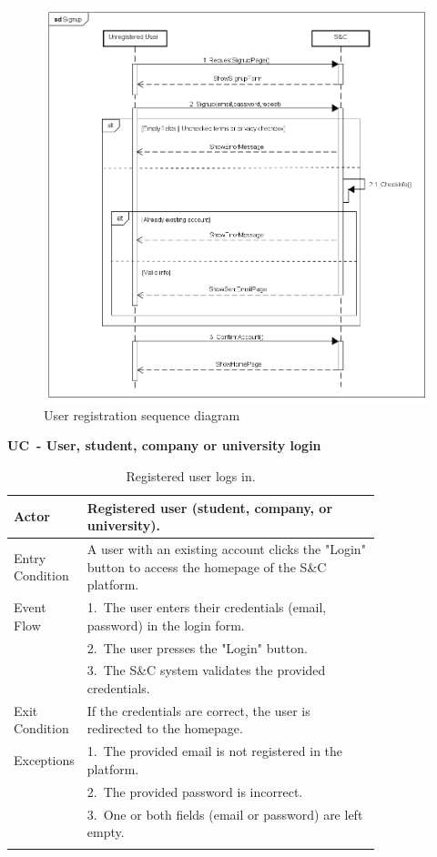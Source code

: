 \begin{figure}[H]
    \centering
    \includegraphics[width=1\linewidth]{Images/Sequence diagrams/Signup.png}
    \caption{User registration sequence diagram}
    \label{fig:enter-label}
\end{figure}

\textbf{UC\cuc\  - User, student, company or university login}

\begin{center}
    \renewcommand{\arraystretch}{1.2} 
    \begin{longtable}{ l p{0.8\linewidth} } 
        \hline
        Actor & Registered user (student, company, or university). \\ \hline
        Entry Condition & A user with an existing account clicks the "Login" button to access the homepage of the S\&C platform. \\ \hline
        Event Flow & 1.\ The user enters their credentials (email, password) in the login form. \\ 
        & 2.\ The user presses the "Login" button. \\ 
        & 3.\ The S\&C system validates the provided credentials. \\ \hline
        Exit Condition & If the credentials are correct, the user is redirected to the homepage. \\ \hline
        Exceptions & 1.\ The provided email is not registered in the platform. \\ 
        & 2.\ The provided password is incorrect. \\ 
        & 3.\ One or both fields (email or password) are left empty. \\ \hline
        \caption{Registered user logs in.}
        \label{tab:goals_tab}%
    \end{longtable}
\end{center}



